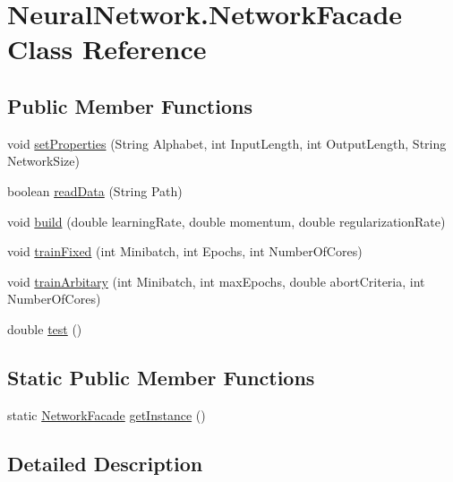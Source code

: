 \hypertarget{class_neural_network_1_1_network_facade}{}\section{Neural\+Network.\+Network\+Facade Class Reference}
\label{class_neural_network_1_1_network_facade}
\subsection*{Public Member Functions}
\begin{DoxyCompactItemize}
\item 
void \hyperlink{class_neural_network_1_1_network_facade_ab16cbf46d8ed3e7979c23733e2dbff69}{set\+Properties} (String Alphabet, int Input\+Length, int Output\+Length, String Network\+Size)
\item 
boolean \hyperlink{class_neural_network_1_1_network_facade_aa27e6b956cc087c91f201ad517dee617}{read\+Data} (String Path)
\item 
void \hyperlink{class_neural_network_1_1_network_facade_ac192d414646236c0208553e650f99c50}{build} (double learning\+Rate, double momentum, double regularization\+Rate)
\item 
void \hyperlink{class_neural_network_1_1_network_facade_aed33ade47d951c3d8959658c265e34c2}{train\+Fixed} (int Minibatch, int Epochs, int Number\+Of\+Cores)
\item 
void \hyperlink{class_neural_network_1_1_network_facade_a8495ce69d130995501b9007cd9b2f522}{train\+Arbitary} (int Minibatch, int max\+Epochs, double abort\+Criteria, int Number\+Of\+Cores)
\item 
double \hyperlink{class_neural_network_1_1_network_facade_a9f455c7791931ec34143a68756a29c85}{test} ()
\end{DoxyCompactItemize}
\subsection*{Static Public Member Functions}
\begin{DoxyCompactItemize}
\item 
static \hyperlink{class_neural_network_1_1_network_facade}{Network\+Facade} \hyperlink{class_neural_network_1_1_network_facade_a60976bf6c0ef88c147e2bc4dbc68230f}{get\+Instance} ()
\end{DoxyCompactItemize}


\subsection{Detailed Description}


